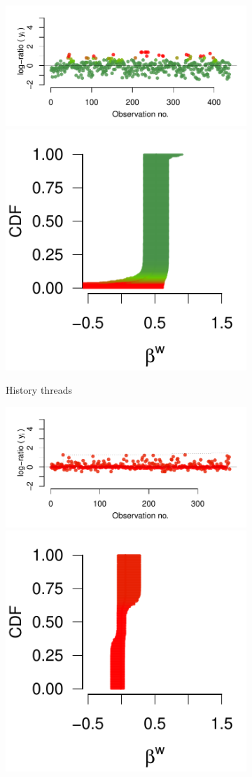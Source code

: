 \documentclass[9pt,a4paper,twocolumn,lineno]{article}
\begin{document}
\begin{figure}
\begin{subfigure}{.49\linewidth}
		{\includegraphics[width=.65\linewidth]{threads/thread_history_1097_9}\includegraphics[width=.33\linewidth]{betas/beta_history_1097_9}}
		
		
		\vspace{10px}
		\hspace{10px}
		\center History threads
		
		\label{fig:supp hist}
	\end{subfigure}
	\begin{subfigure}{.49\linewidth}
		{\includegraphics[width=.65\linewidth]{threads/thread_max_55_1}	\includegraphics[width=.33\linewidth]{betas/beta_max_55_1}	}


\end{subfigure}
\end{figure}
\end{document}
